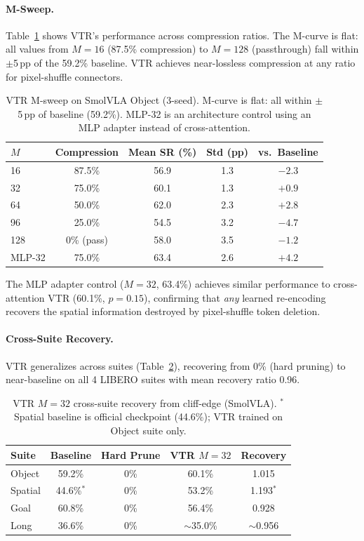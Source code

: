 \documentclass[10pt,twocolumn]{article}
\begin{document}
\paragraph{M-Sweep.}
Table~\ref{tab:vtr_msweep} shows VTR's performance across compression ratios.
The M-curve is flat: all values from $M\!=\!16$ (87.5\% compression) to $M\!=\!128$ (passthrough) fall within $\pm$5\,pp of the 59.2\% baseline.
VTR achieves near-lossless compression at any ratio for pixel-shuffle connectors.

\begin{table}[t]
\centering
\caption{VTR M-sweep on SmolVLA Object (3-seed). M-curve is flat: all within $\pm$5\,pp of baseline (59.2\%). MLP-32 is an architecture control using an MLP adapter instead of cross-attention.}
\label{tab:vtr_msweep}
\small
\begin{tabular}{@{}lcccc@{}}
\toprule
$M$ & Compression & Mean SR (\%) & Std (pp) & vs.\ Baseline \\
\midrule
16 & 87.5\% & 56.9 & 1.3 & $-2.3$ \\
32 & 75.0\% & 60.1 & 1.3 & $+0.9$ \\
64 & 50.0\% & 62.0 & 2.3 & $+2.8$ \\
96 & 25.0\% & 54.5 & 3.2 & $-4.7$ \\
128 & 0\% (pass) & 58.0 & 3.5 & $-1.2$ \\
\midrule
MLP-32 & 75.0\% & 63.4 & 2.6 & $+4.2$ \\
\bottomrule
\end{tabular}
\end{table}

The MLP adapter control ($M\!=\!32$, 63.4\%) achieves similar performance to cross-attention VTR (60.1\%, $p\!=\!0.15$), confirming that \emph{any} learned re-encoding recovers the spatial information destroyed by pixel-shuffle token deletion.

\paragraph{Cross-Suite Recovery.}
VTR generalizes across suites (Table~\ref{tab:vtr_cross_suite}), recovering from 0\% (hard pruning) to near-baseline on all 4 LIBERO suites with mean recovery ratio 0.96.

\begin{table}[t]
\centering
\caption{VTR $M\!=\!32$ cross-suite recovery from cliff-edge (SmolVLA). $^*$Spatial baseline is official checkpoint (44.6\%); VTR trained on Object suite only.}
\label{tab:vtr_cross_suite}
\small
\begin{tabular}{@{}lcccc@{}}
\toprule
Suite & Baseline & Hard Prune & VTR $M\!=\!32$ & Recovery \\
\midrule
Object & 59.2\% & 0\% & 60.1\% & 1.015 \\
Spatial & 44.6\%$^*$ & 0\% & 53.2\% & 1.193$^*$ \\
Goal & 60.8\% & 0\% & 56.4\% & 0.928 \\
Long & 36.6\% & 0\% & ${\sim}$35.0\% & ${\sim}$0.956 \\
\bottomrule
\end{tabular}
\end{table}
\end{document}
